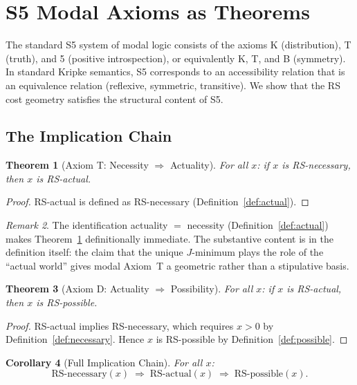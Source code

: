 \documentclass[12pt,a4paper]{article}
\newtheorem{theorem}{Theorem}[section]
\newtheorem{corollary}[theorem]{Corollary}
\theoremstyle{definition}
\theoremstyle{remark}
\newtheorem{remark}[theorem]{Remark}
\begin{document}
\section{S5 Modal Axioms as Theorems}
\label{sec:s5}

The standard S5 system of modal logic consists of the axioms K
(distribution), T (truth), and 5 (positive introspection), or
equivalently K, T, and B (symmetry).  In standard Kripke semantics, S5
corresponds to an accessibility relation that is an equivalence relation
(reflexive, symmetric, transitive).  We show that the RS cost geometry
satisfies the structural content of S5.

\subsection{The Implication Chain}

\begin{theorem}[Axiom T: Necessity $\Rightarrow$ Actuality]
\label{thm:T}
For all $x$: if $x$ is RS-necessary, then $x$ is RS-actual.
\end{theorem}

\begin{proof}
RS-actual is defined as RS-necessary (Definition~\ref{def:actual}).
\end{proof}

\begin{remark}
The identification actuality $=$ necessity (Definition~\ref{def:actual})
makes Theorem~\ref{thm:T} definitionally immediate.  The substantive
content is in the definition itself: the claim that the unique
$J$-minimum plays the role of the ``actual world'' gives modal Axiom~T a
geometric rather than a stipulative basis.
\end{remark}

\begin{theorem}[Axiom D: Actuality $\Rightarrow$ Possibility]
\label{thm:D}
For all $x$: if $x$ is RS-actual, then $x$ is RS-possible.
\end{theorem}

\begin{proof}
RS-actual implies RS-necessary, which requires $x > 0$ by
Definition~\ref{def:necessary}.  Hence $x$ is RS-possible by
Definition~\ref{def:possible}.
\end{proof}

\begin{corollary}[Full Implication Chain]
\label{cor:chain}
For all $x$:
\[
  \text{RS-necessary}(x) \;\Longrightarrow\; \text{RS-actual}(x)
  \;\Longrightarrow\; \text{RS-possible}(x).
\]
\end{corollary}
\end{document}
